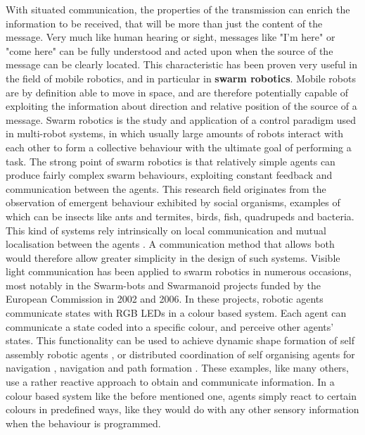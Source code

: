 With situated communication, the properties of the transmission can enrich the information to be received, that will be more than just the content of the message.
Very much like human hearing or sight, messages like "I'm here" or "come here" can be fully understood and acted upon when the source of the message can be clearly located.
\newline
This characteristic has been proven very useful in the field of mobile robotics, and in particular in \textbf{swarm robotics}.
Mobile robots are by definition able to move in space, and are therefore potentially capable of exploiting the information about direction and relative position of the source of a message.
Swarm robotics is the study and application of a control paradigm used in multi-robot systems, in which usually large amounts of robots interact with each other to form a collective behaviour with the ultimate goal of performing a task.
The strong point of swarm robotics is that relatively simple agents can produce fairly complex swarm behaviours, exploiting constant feedback and communication between the agents.
This research field originates from the observation of emergent behaviour exhibited by social organisms, examples of which can be insects like ants and termites, birds, fish, quadrupeds and bacteria.
This kind of systems rely intrinsically on local communication and mutual localisation between the agents \cite{architecturesswarm}.
A communication method that allows both would therefore allow greater simplicity in the design of such systems.
\newline
Visible light communication has been applied to swarm robotics in numerous occasions, most notably in the Swarm-bots and Swarmanoid projects funded by the European Commission in 2002 and 2006.
In these projects, robotic agents communicate states with RGB LEDs in a colour based system.
Each agent can communicate a state coded into a specific colour, and perceive other agents' states.
This functionality can be used to achieve dynamic shape formation of self assembly robotic agents  \cite{assemblysbots}, or distributed coordination of self organising agents for navigation \cite{distrcoord} \cite{holeavoidance}, navigation and path formation \cite{pathformation}.
\newline
These examples, like many others, use a rather reactive approach to obtain and communicate information.
In a colour based system like the before mentioned one, agents simply react to certain colours in predefined ways, like they would do with any other sensory information when the behaviour is programmed.
